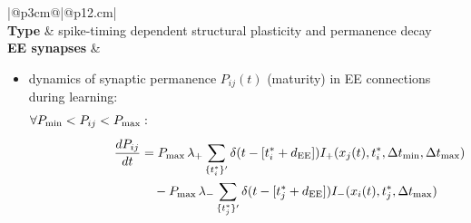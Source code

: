 \documentclass[10pt,a4paper,twoside,american]{article}
\newcommand{\EE}{{\exc\exc}}
\newcommand{\exc}{\textnormal{E}}     %
\begin{document}
\begin{table}[ht!]
  \small
  \begin{tabular}{|@{\hspace*{1mm}}p{3cm}@{}|@{\hspace*{1mm}}p{}|}
  \hline 
  \\
  \hline
  \textbf{Type} & spike-timing dependent structural plasticity and permanence decay \\
  \hline
  \textbf{EE synapses} &
      \begin{itemize}  
        \item dynamics of synaptic permanence $P_{ij}(t)$ (maturity) in EE connections during learning:
          \begin{equation}
            \label{eq:plasticity}
          \begin{aligned}
            \forall P_\text{min}<P_{ij}<P_\text{max}&: \\[1ex]
            \frac{dP_{ij}}{dt} &= P_\text{max} \, \lambda_{+} \sum_{\{t_i^*\}^\prime} \delta(t-[t_i^*+d_\EE]) I_{+}(x_j(t), t_i^*,\Delta{}t_\text{min},\Delta{}t_\text{max}) \\
            &\quad - P_\text{max} \, \lambda_{-} \sum_{\{t_j^*\}^\prime} \delta(t-[t_j^*+d_\EE]) I_{-}(x_i(t),t_j^*,\Delta{}t_\text{max}) \\

\end{aligned}
\end{equation}
\end{itemize}
\end{tabular}
\end{table}
\end{document}
